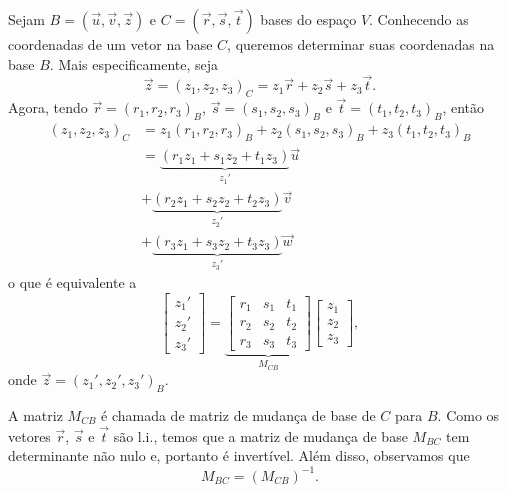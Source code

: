 Sejam $B = (\vec{u}, \vec{v}, \vec{z})$ e $C = (\vec{r}, \vec{s}, \vec{t})$ bases do espaço $V$. Conhecendo as coordenadas de um vetor na base $C$, queremos determinar suas coordenadas na base $B$. Mais especificamente, seja
\begin{equation}
  \vec{z} = (z_1, z_2, z_3)_C = z_1\vec{r} + z_2\vec{s} + z_3\vec{t}.
\end{equation}
Agora, tendo $\vec{r} = (r_1, r_2, r_3)_B$, $\vec{s} = (s_1, s_2, s_3)_B$ e $\vec{t} = (t_1, t_2, t_3)_B$, então
\begin{align}
  (z_1, z_2, z_3)_C &= z_1(r_1, r_2, r_3)_B + z_2(s_1, s_2, s_3)_B + z_3(t_1, t_2, t_3)_B\\
                    &= \underbrace{(r_1z_1+s_1z_2+t_1z_3)}_{z_1'}\vec{u}\\
                    &+ \underbrace{(r_2z_1+s_2z_2+t_2z_3)}_{z_2'}\vec{v}\\
                    &+ \underbrace{(r_3z_1+s_3z_2+t_3z_3)}_{z_3'}\vec{w}
\end{align}
o que é equivalente a
\begin{equation}
  \begin{bmatrix}
    z_1'\\
    z_2'\\
    z_3'
  \end{bmatrix} =
  \underbrace{\begin{bmatrix}
    r_1 & s_1 & t_1\\
    r_2 & s_2 & t_2\\
    r_3 & s_3 & t_3
  \end{bmatrix}}_{M_{CB}}
  \begin{bmatrix}
    z_1\\
    z_2\\
    z_3
  \end{bmatrix},
\end{equation}
onde $\vec{z} = (z_1', z_2', z_3')_B$.

A matriz $M_{CB}$ é chamada de matriz de mudança de base de $C$ para $B$. Como os vetores $\vec{r}$, $\vec{s}$ e $\vec{t}$ são l.i., temos que a matriz de mudança de base $M_{BC}$ tem determinante não nulo e, portanto é invertível. Além disso, observamos que
\begin{equation}
  M_{BC} = (M_{CB})^{-1}. 
\end{equation}

